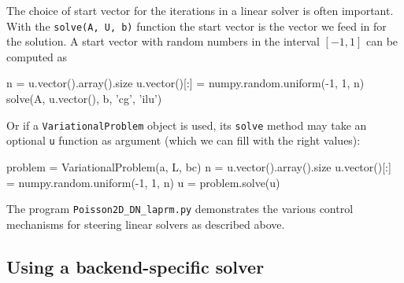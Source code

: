 The choice of start vector for the iterations in a linear solver is often
important. With the {\fontsize{10pt}{10pt}\texttt{solve(A, U, b)}} function the start vector
is the vector we feed in for the solution. A start vector
with random numbers in the interval $[-1,1]$ can be computed as
\begin{python}
n = u.vector().array().size
u.vector()[:] = numpy.random.uniform(-1, 1, n)
solve(A, u.vector(), b, 'cg', 'ilu')
\end{python}
Or if a {\fontsize{10pt}{10pt}\texttt{VariationalProblem}} object is used, its {\fontsize{10pt}{10pt}\texttt{solve}}
method may take an optional {\fontsize{10pt}{10pt}\texttt{u}} function as argument (which we
can fill with the right values):
\begin{python}
problem = VariationalProblem(a, L, bc)
n = u.vector().array().size
u.vector()[:] = numpy.random.uniform(-1, 1, n)
u = problem.solve(u)
\end{python}

The program {\fontsize{10pt}{10pt}\verb!Poisson2D_DN_laprm.py!} demonstrates the various control mechanisms for
steering linear solvers as described above.

\subsection{Using a backend-specific solver}
\label{langtangen:Epetra}


